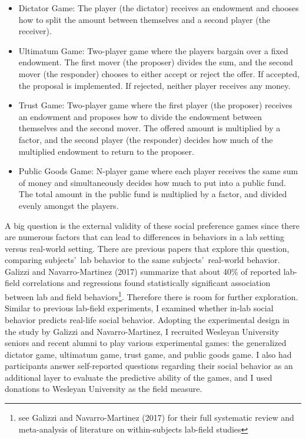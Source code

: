 \documentclass[12pt]{article}
\begin{document}
\begin{itemize}

\item{Dictator Game}: The player (the dictator) receives an endowment and chooses how to split the amount between themselves and a second player (the receiver).
\item{Ultimatum Game}: Two-player game where the players bargain over a fixed endowment. The first mover (the proposer) divides the sum, and the second mover (the responder) chooses to either accept or reject the offer. If accepted, the proposal is implemented. If rejected, neither player receives any money.
\item{Trust Game}: Two-player game where the first player (the proposer) receives an endowment and proposes how to divide the endowment between themselves and the second mover. The offered amount is multiplied by a factor, and the second player (the responder) decides how much of the multiplied endowment to return to the proposer. 
\item{Public Goods Game}: N-player game where each player receives the same sum of money and simultaneously decides how much to put into a public fund. The total amount in the public fund is multiplied by a factor, and divided evenly amongst the players. \end{itemize}

A big question is the external validity of these social preference games since there are numerous factors that can lead to differences in behaviors in a lab setting versus real-world setting. There are previous papers that explore this question, comparing subjects\rq \ lab behavior  to the same subjects\rq \ real-world behavior. Galizzi and Navarro-Martinez (2017) summarize that about 40\% of reported lab-field correlations and regressions found statistically significant association between lab and field behaviors\footnote{see Galizzi and Navarro-Martinez (2017) for their full systematic review and meta-analysis of literature on within-subjects lab-field studies}. Therefore there is room for further exploration. Similar to previous lab-field experiments, I examined whether in-lab social behavior predicts real-life social behavior. Adopting the experimental design in the study by Galizzi and Navarro-Martinez, I recruited Wesleyan University seniors and recent alumni to play various experimental games: the generalized dictator game, ultimatum game, trust game, and public goods game. I also had participants answer self-reported questions regarding their social behavior as an additional layer to evaluate the predictive ability of the games, and I used donations to Wesleyan University as the field measure.
\end{document}
